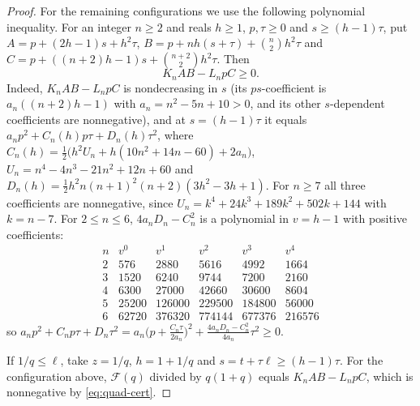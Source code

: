 \begin{proof}
For the remaining configurations we use the following polynomial inequality. For an integer $n\geq2$ and reals $h\geq1$, $p,\tau\geq0$ and $s\geq(h-1)\tau$, put $A=p+(2h-1)s+h^2\tau$, $B=p+nh(s+\tau)+\binom n2h^2\tau$ and $C=p+((n+2)h-1)s+\binom{n+2}2h^2\tau$. Then
\begin{equation}\label{eq:quad-cert}
K_nAB-L_npC\geq0.
\end{equation}
Indeed, $K_nAB-L_npC$ is nondecreasing in $s$ (its $ps$-coefficient is $a_n((n+2)h-1)$ with $a_n=n^2-5n+10>0$, and its other $s$-dependent coefficients are nonnegative), and at $s=(h-1)\tau$ it equals $a_np^2+C_n(h)p\tau+D_n(h)\tau^2$, where $C_n(h)=\frac12\bigl(h^2U_n+h(10n^2+14n-60)+2a_n\bigr)$, $U_n=n^4-4n^3-21n^2+12n+60$ and $D_n(h)=\frac12h^2n(n+1)^2(n+2)(3h^2-3h+1)$. For $n\geq7$ all three coefficients are nonnegative, since $U_n=k^4+24k^3+189k^2+502k+144$ with $k=n-7$. For $2\leq n\leq6$, $4a_nD_n-C_n^2$ is a polynomial in $v=h-1$ with positive coefficients:
\[
\begin{array}{c|ccccc}
n&v^0&v^1&v^2&v^3&v^4\\\hline
2&576&2880&5616&4992&1664\\
3&1520&6240&9744&7200&2160\\
4&6300&27000&42660&30600&8604\\
5&25200&126000&229500&184800&56000\\
6&62720&376320&774144&677376&216576
\end{array}
\]
so $a_np^2+C_np\tau+D_n\tau^2=a_n\bigl(p+\frac{C_n\tau}{2a_n}\bigr)^2+\frac{4a_nD_n-C_n^2}{4a_n}\tau^2\geq0$.

If $1/q\leq\ell$, take $z=1/q$, $h=1+1/q$ and $s=t+\tau\ell\geq(h-1)\tau$. For the configuration above, $\mathcal F(q)$ divided by $q(1+q)$ equals $K_nAB-L_npC$, which is nonnegative by \eqref{eq:quad-cert}.


\end{proof}

